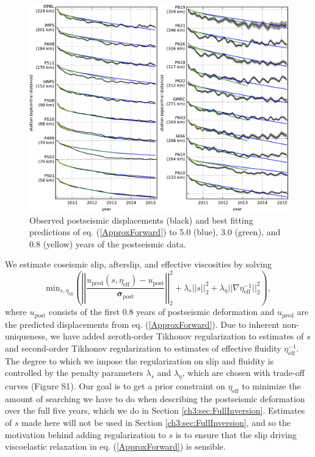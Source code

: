 \begin{figure}
\includegraphics[scale=1.0]{ch3/figures/2016jb013114-p10}
\caption{Observed postseismic displacements (black) and best fitting predictions of eq. (\ref{ApproxForward}) to 5.0 (blue), 3.0 (green), and 0.8 (yellow) years of the postseismic data.} 
\label{ch3:fig:RecordSection1}
\end{figure}

We estimate coseismic slip, afterslip, and effective viscosities by solving 
\begin{equation}\label{ObjectiveFunction}
 \mathrm{min}_{s,\eta_\mathrm{eff}} \left(\left|\left|
 \frac{u_\mathrm{pred}(s,\eta_\mathrm{eff}) - u_\mathrm{post}}
 {\mathbf{\sigma_\mathrm{post}}}\right|\right|_2^2 + 
 \lambda_s||s||_2^2 + 
 \lambda_\eta||\nabla \eta_{\mathrm{eff}}^{-1}||_2^2\right),
\end{equation} 
where $u_\mathrm{post}$ consists of the first 0.8 years of postseismic deformation and $u_\mathrm{pred}$ are the predicted displacements from eq. (\ref{ApproxForward}).  Due to inherent non-uniqueness, we have added zeroth-order Tikhonov regularization to estimates of $s$ and second-order Tikhonov regularization to estimates of effective fluidity $\eta_\mathrm{eff}^{-1}$. The degree to which we impose the regularization on slip and fluidity is controlled by the penalty parameters $\lambda_s$ and $\lambda_\eta$, which are chosen with trade-off curves (Figure S1).  Our goal is to get a prior constraint on $\eta_{\mathrm{eff}}$ to minimize the amount of searching we have to do when describing the postseismic deformation over the full five years, which we do in Section \ref{ch3:sec:FullInversion}.  Estimates of $s$ made here will not be used in Section \ref{ch3:sec:FullInversion}, and so the motivation behind adding regularization to $s$ is to ensure that the slip driving viscoelastic relaxation in eq. (\ref{ApproxForward}) is sensible.  

